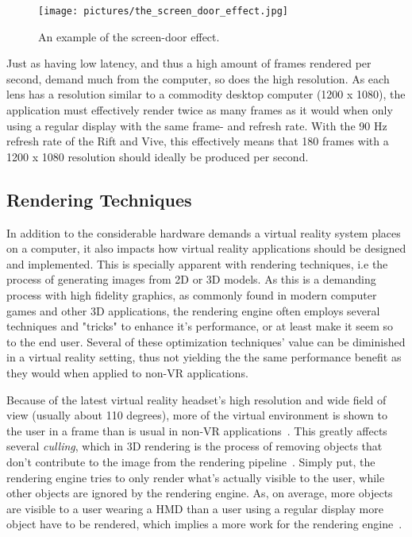 \begin{figure}%
	\texttt{[image: pictures/the\_screen\_door\_effect.jpg]}
	\caption[The screen-door effect]{An example of the screen-door effect.}
	\label{fig:the_screen_door_effect}
\end{figure} 

Just as having low latency, and thus a high amount of frames rendered per second, demand much from the computer, so does the high resolution.
As each lens has a resolution similar to a commodity desktop computer (1200 x 1080), the application must effectively render twice as many frames
as it would when only using a regular display with the same frame- and refresh rate. With the 90 Hz refresh rate of the Rift and Vive, this effectively means
that 180 frames with a 1200 x 1080 resolution should ideally be produced per second.  

\subsection{Rendering Techniques}
In addition to the considerable hardware demands a virtual reality system places on a computer, it also impacts how virtual reality applications should be designed and implemented. 
This is specially apparent with rendering techniques, i.e the process of generating images from 2D or 3D models. 
As this is a demanding process with high fidelity graphics, as commonly found in modern computer games and other 3D applications, the rendering engine often employs several 
techniques and "tricks" to enhance it's performance, or at least make it seem so to the end user.
Several of these optimization techniques' value can be diminished in a virtual reality setting, thus not yielding the 
the same performance benefit as they would when applied to non-VR applications.

Because of the latest virtual reality headset's high resolution and wide field of view (usually about 110 degrees), 
more of the virtual environment is shown to the user in a frame than is usual in non-VR applications~\citep{Ohannessian2016}. 
This greatly affects several \textit{culling}, which in 3D rendering is the process of removing objects that don't contribute to the 
image from the rendering pipeline~\citep{Johnson2013}.
Simply put, the rendering engine tries to only render what's actually visible to the user, while other objects are ignored by the rendering engine. 
As, on average, more objects are visible to a user wearing a HMD than a user using a regular display more object have to be rendered, which implies a more work for the rendering
engine~\citep{Ohannessian2016}. 

